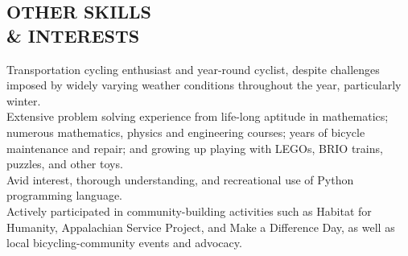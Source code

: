 \documentclass[line,margin]{res}
\begin{document}
\begin{resume}
\section{OTHER SKILLS \\ \& INTERESTS}
    Transportation cycling enthusiast and year-round cyclist, despite
    challenges imposed by widely varying weather conditions throughout the
    year, particularly winter.
    \vspace{1.5 mm} \\
    Extensive problem solving experience from life-long aptitude in
    mathematics; numerous mathematics, physics and engineering courses;
    years of bicycle maintenance and repair; and growing up playing with
    LEGOs, BRIO trains, puzzles, and other toys.
    \vspace{1.5 mm} \\
    Avid interest, thorough understanding, and recreational use of Python
    programming language.
    \vspace{1.5 mm} \\
    Actively participated in community-building activities such as Habitat
    for Humanity, Appalachian Service Project, and Make a Difference Day,
    as well as local bicycling-community events and advocacy.

\end{resume}
\end{document}
